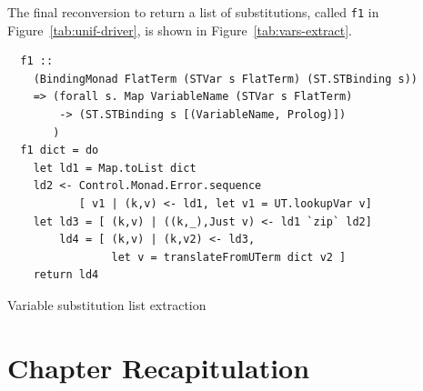 \documentclass[thesis-solanki.tex]{subfiles}
\begin{document}
The final reconversion to return a list of substitutions,
  called \texttt{f1} in Figure~\ref{tab:unif-driver}, is shown in
  Figure~\ref{tab:vars-extract}.
\begin{code-list}
  \begin{verbatim}
  f1 ::
    (BindingMonad FlatTerm (STVar s FlatTerm) (ST.STBinding s))
    => (forall s. Map VariableName (STVar s FlatTerm)
        -> (ST.STBinding s [(VariableName, Prolog)])
       )
  f1 dict = do
    let ld1 = Map.toList dict
    ld2 <- Control.Monad.Error.sequence
           [ v1 | (k,v) <- ld1, let v1 = UT.lookupVar v]
    let ld3 = [ (k,v) | ((k,_),Just v) <- ld1 `zip` ld2]
        ld4 = [ (k,v) | (k,v2) <- ld3,
                let v = translateFromUTerm dict v2 ]
    return ld4
  \end{verbatim}
  \vspace*{-1.0\baselineskip}
  \caption{Variable substitution list extraction}
  \label{tab:vars-extract}
\end{code-list}

\clearpage
\section{Chapter Recapitulation}

\ifMain
\begin{scope}
  \nolinenumbers
  \enotesize
  \par
  \begin{singlespace}
  \setlength{\parskip}{12pt plus 2pt minus 1pt}
  \theendnotes
  \par
  \end{singlespace}
\end{scope}
\fi
\end{document}

